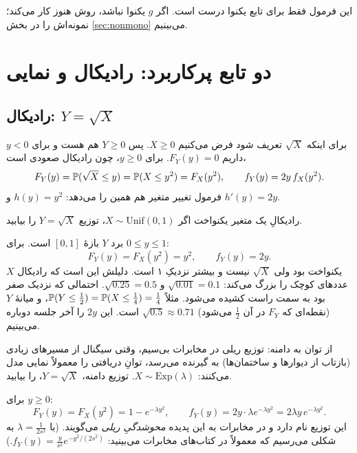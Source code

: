 این فرمول فقط برای تابع یکنوا درست است. اگر $g$ یکنوا نباشد، روش  هنوز کار می‌کند؛ نمونه‌اش را در بخش \ref{sec:nonmono} می‌بینیم.

\section{دو تابع پرکاربرد: رادیکال و نمایی}
\label{sec:sqrt-exp}

\subsection{رادیکال: $Y=\sqrt X$}

برای اینکه $\sqrt X$ تعریف شود فرض می‌کنیم $X\ge0$. پس $Y\ge0$ هم هست و برای $y<0$ داریم $F_Y(y)=0$. برای $y\ge0$، چون رادیکال صعودی است،
\[ F_Y(y)=\P(\sqrt X\le y)=\P(X\le y^2)=F_X(y^2),\qquad f_Y(y)=2y\,f_X(y^2). \]
فرمول تغییر متغیر هم همین را می‌دهد: $h(y)=y^2$ و $h'(y)=2y$.

\begin{example}[label=ex:sqrt]{رادیکالِ یک متغیر یکنواخت}
اگر $X\sim\mathrm{Unif}(0,1)$، توزیع $Y=\sqrt X$ را بیابید.
\begin{solution}
برد $Y$ بازهٔ $[0,1]$ است. برای $0\le y\le1$:
\[ F_Y(y)=F_X(y^2)=y^2,\qquad f_Y(y)=2y. \]
$X$ یکنواخت بود ولی $\sqrt X$ نیست و بیشتر نزدیکِ ۱ است. دلیلش این است که رادیکال عددهای کوچک را بزرگ می‌کند: $\sqrt{0.01}=0.1$ و $\sqrt{0.25}=0.5$. احتمالی که نزدیک صفر بود به سمت راست کشیده می‌شود. مثلاً $\P(Y\le\tfrac12)=\P(X\le\tfrac14)=\tfrac14$، و میانهٔ $Y$ (نقطه‌ای که $F_Y$ در آن $\frac12$ می‌شود) $\sqrt{0.5}\approx0.71$ است. این $2y$ را آخر جلسه دوباره می‌بینیم.
\end{solution}
\end{example}

\begin{example}[label=ex:rayleigh]{از توان به دامنه: توزیع ریلی}
در مخابرات بی‌سیم، وقتی سیگنال از مسیرهای زیادی (بازتاب از دیوارها و ساختمان‌ها) به گیرنده می‌رسد، توانِ دریافتی را معمولاً نمایی مدل می‌کنند: $X\sim\mathrm{Exp}(\lambda)$. توزیع دامنه، $Y=\sqrt X$، را بیابید.
\begin{solution}
برای $y\ge0$:
\[ F_Y(y)=F_X(y^2)=1-e^{-\lambda y^2},\qquad f_Y(y)=2y\cdot\lambda e^{-\lambda y^2}=2\lambda y\,e^{-\lambda y^2}. \]
این توزیع  نام دارد و در مخابرات به این پدیده \emph{محوشدگیِ ریلی} می‌گویند. (با $\lambda=\frac{1}{2s^2}$ به شکلی می‌رسیم که معمولاً در کتاب‌های مخابرات می‌بینید: $f_Y(y)=\frac{y}{s^2}e^{-y^2/(2s^2)}$.)

\end{solution}
\end{example}

